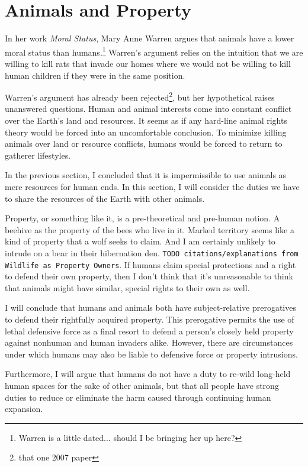 \documentclass[12pt]{book}
\begin{document}
\chapter{Animals and Property}

    In her work \emph{Moral Status}, Mary Anne Warren argues that animals have
    a lower moral status than humans.\footnote{Warren is a little dated...
    should I be bringing her up here?} Warren's argument relies on the intuition
    that we are willing to kill rats that invade our homes where we would not
    be willing to kill human children if they were in the same position.
    
    Warren's argument has already been rejected\footnote{that one 2007 paper},
    but her hypothetical raises unanswered questions. Human and animal interests
    come into constant conflict over the Earth's land and resources. It seems as
    if any hard-line animal rights theory would be forced into an uncomfortable
    conclusion. To minimize killing animals over land or resource
    conflicts, humans would be forced to return to gatherer lifestyles.
    
    In the previous section, I concluded that it is impermissible to use
    animals as mere resources for human ends. In this section, I will consider
    the duties we have to share the resources of the Earth with other animals.

	Property, or something like it, is a pre-theoretical and pre-human notion.
	A beehive as the property of the bees who live in it.  Marked territory
	seems like a kind of property that a wolf seeks to claim.  And I am
	certainly unlikely to intrude on a bear in their hibernation den.
	\texttt{TODO citations/explanations from Wildlife as Property Owners}.  If
	humans claim special protections and a right to defend their own property,
	then I don’t think that it’s unreasonable to think that animals might have
	similar, special rights to their own as well.
    
    I will conclude that humans and animals both have subject-relative 
    prerogatives to defend their rightfully acquired property. This prerogative
    permits the use of lethal defensive force as a final resort to defend
    a person's closely held property against nonhuman and human invaders alike.
    However, there are circumstances under which humans may also be liable
    to defensive force or property intrusions.
    
    Furthermore, I will argue that humans do not have a duty to re-wild
    long-held human spaces for the sake of other animals, but that all people
    have strong duties to reduce or eliminate the harm caused through
    continuing human expansion.
    
\end{document}
